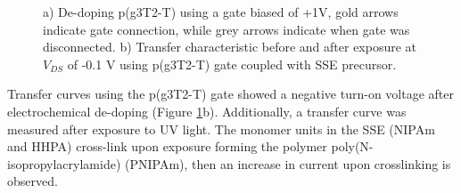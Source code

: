 \begin{figure}[ht]
    \centering
    \caption[Electrochemical de-doping of oxidized p(g3T2-T) OECT]{a) De-doping p(g3T2-T) using a gate biased of +1V, gold arrows indicate gate connection, while grey arrows indicate when gate was disconnected. b) Transfer characteristic before and after exposure at $V_{DS}$ of -0.1 V using p(g3T2-T) gate coupled with SSE precursor.}
    \label{fig:revox2}
\end{figure}

Transfer curves using the p(g3T2-T) gate showed a negative turn-on voltage after electrochemical de-doping (Figure \ref{fig:revox2}b). Additionally, a transfer curve was measured after exposure to UV light. The monomer units in the SSE (NIPAm and HHPA) cross-link upon exposure forming the polymer poly(N-isopropylacrylamide) (PNIPAm), then an increase in current upon crosslinking is observed.

